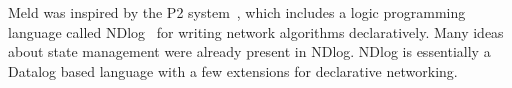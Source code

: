 Meld was inspired by the P2 system~\cite{Loo-condie-garofalakis-p2}, which
includes a logic programming language called NDlog~\cite{Loo:EECS-2006-177} for
writing network algorithms declaratively. Many ideas about state management were
already present in NDlog.  NDlog is essentially a Datalog based language with a
few extensions for declarative networking.
